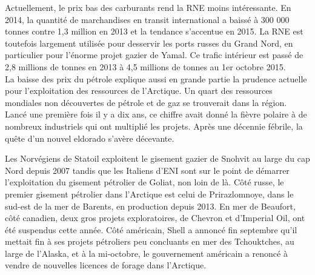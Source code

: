 \documentclass[8pt]{article}
\begin{document}
Actuellement, le prix bas des carburants rend la RNE moins intéressante. En 2014, la quantité de marchandises en transit international a baissé à 300 000 tonnes contre 1,3 million en 2013 et la tendance s’accentue en 2015. La RNE est toutefois largement utilisée pour desservir les ports russes du Grand Nord, en particulier pour l’énorme projet gazier de Yamal. Ce trafic intérieur est passé de 2,8 millions de tonnes en 2013 à 4,5 millions de tonnes au 1er octobre 2015.\\

La baisse des prix du pétrole explique aussi en grande partie la prudence actuelle pour l’exploitation des ressources de l’Arctique. Un quart des ressources mondiales non découvertes de pétrole et de gaz se trouverait dans la région. Lancé une première fois il y a dix ans, ce chiffre avait donné la fièvre polaire à de nombreux industriels qui ont multiplié les projets. Après une décennie fébrile, la quête d’un nouvel eldorado s’avère décevante.\\

\begin{center}
\end{center}

Les Norvégiens de Statoil exploitent le gisement gazier de Snohvit au large du cap Nord depuis 2007 tandis que les Italiens d’ENI sont sur le point de démarrer l’exploitation du gisement pétrolier de Goliat, non loin de là. Côté russe, le premier gisement pétrolier dans l’Arctique est celui de Prirazlomnoye, dans le sud-est de la mer de Barents, en production depuis 2013. En mer de Beaufort, côté canadien, deux gros projets exploratoires, de Chevron et d’Imperial Oil, ont été suspendus cette année. Côté américain, Shell a annoncé fin septembre qu’il mettait fin à ses projets pétroliers peu concluants en mer des Tchouktches, au large de l’Alaska, et à la mi-octobre, le gouvernement américain a renoncé à vendre de nouvelles licences de forage dans l’Arctique.\\
\end{document}
